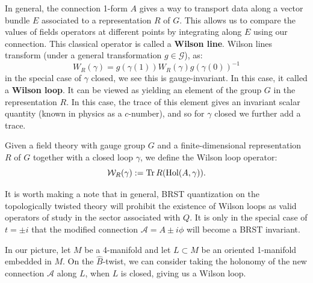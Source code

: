	In general, the connection 1-form $A$ gives a way to transport data along a vector bundle $E$ associated to a representation $R$ of $G$. This allows us to compare the values of fields operators at different points by integrating along $E$ using our connection. %
	This classical operator is called a \textbf{Wilson line}.
	Wilson lines transform (under a general transformation $g \in \mathcal G$), as:
	\begin{equation}
		W_R(\gamma) = g(\gamma(1)) W_R(\gamma)  g(\gamma(0))^{-1}
	\end{equation}
	in the special case of $\gamma$ closed, we see this is gauge-invariant. In this case, it called a \textbf{Wilson loop}. It can be viewed as yielding an element of the group $G$ in the representation $R$. In this case, the trace of this element gives an invariant scalar quantity (known in physics as a $c$-number), and so for $\gamma$ closed we further add a trace.
	\begin{defn}
		Given a field theory with gauge group $G$ and a finite-dimensional representation $R$ of $G$ together with a closed loop $\gamma$, we define the Wilson loop operator:
		\begin{equation}
			\mathcal W_{R}(\gamma) := \mathrm{Tr}\, R( \mathrm{Hol}(A, \gamma)).
		\end{equation}
	\end{defn}
\noindent

	It is worth making a note that in general, BRST quantization on the topologically twisted theory will prohibit the existence of Wilson loops as valid operators of study in the sector associated with $Q$. It is only in the special case of $t = \pm i$ that the modified connection $\mathcal A = A \pm i \phi$ will become a BRST invariant. 
	
	In our picture, let $M$ be a 4-manifold and let $L \subset M$ be an oriented 1-manifold embedded in $M$. On the $\hat B$-twist, we can consider taking the holonomy of the new connection $\mathcal A$ along $L$, when $L$ is closed, giving us a Wilson loop. 
	
	
